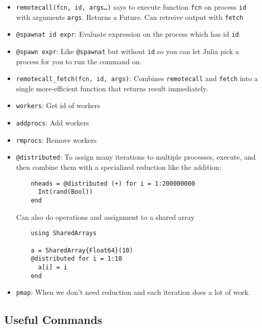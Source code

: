 \documentclass[12pt]{article}
\theoremstyle{plain}
\theoremstyle{definition}
\theoremstyle{remark}
\begin{document}
\begin{itemize}
  \item \texttt{remotecall(fcn, id, args\dots)} says to execute function
    \texttt{fcn} on process \texttt{id} with arguments \texttt{args}.
    Returns a Future.
    Can retreive output with \texttt{fetch}
  \item \texttt{@spawnat id expr}:
    Evaluate expression on the process which has id \texttt{id}.

  \item \texttt{@spawn expr}:
    Like \texttt{@spawnat} but without \texttt{id} so you can let
    Julia pick a process for you to run the command on.

  \item \texttt{remotecall\_fetch(fcn, id, args)}:
    Combines \texttt{remotecall} and \texttt{fetch} into a single
    more-efficient function that returns result immediately.

  \item \texttt{workers}: Get id of workers

  \item \texttt{addprocs}: Add workers

  \item \texttt{rmprocs}: Remove workers


  \item \texttt{@distributed}:
    To assign many iterations to multiple processes, execute, and then
    combine them with a specialized reduction like the addition:
    \begin{lstlisting}
    nheads = @distributed (+) for i = 1:200000000
      Int(rand(Bool))
    end
    \end{lstlisting}
    Can also do operations and assignment to a shared array
    \begin{lstlisting}
    using SharedArrays

    a = SharedArray{Float64}(10)
    @distributed for i = 1:10
      a[i] = i
    end
    \end{lstlisting}

  \item
    \texttt{pmap}:
    When we don't need reduction and each iteration does a lot of work.

\end{itemize}



\subsection{Useful Commands}
\end{document}
